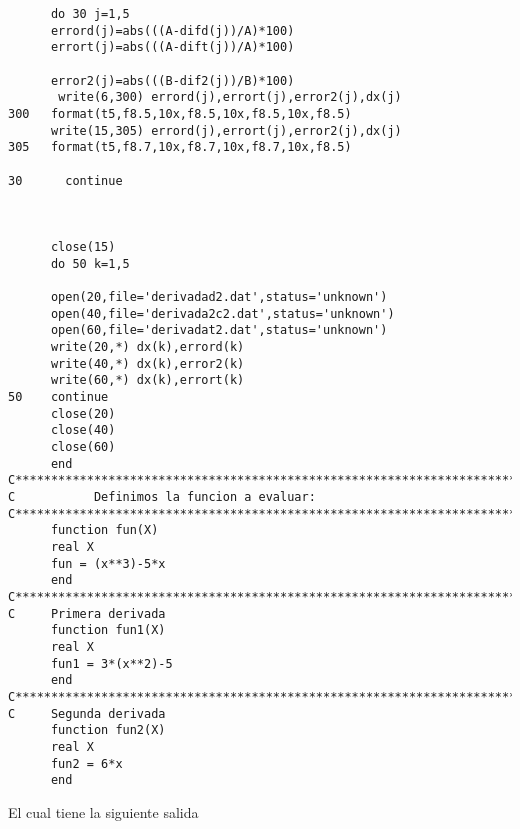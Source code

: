 \documentclass{article}
\begin{document}
\begin{verbatim}
      do 30 j=1,5
      errord(j)=abs(((A-difd(j))/A)*100)
      errort(j)=abs(((A-dift(j))/A)*100)
 
      error2(j)=abs(((B-dif2(j))/B)*100)
       write(6,300) errord(j),errort(j),error2(j),dx(j)
300   format(t5,f8.5,10x,f8.5,10x,f8.5,10x,f8.5)
      write(15,305) errord(j),errort(j),error2(j),dx(j)
305   format(t5,f8.7,10x,f8.7,10x,f8.7,10x,f8.5)
 
30      continue
 
 
 
      close(15)
      do 50 k=1,5
 
      open(20,file='derivadad2.dat',status='unknown')
      open(40,file='derivada2c2.dat',status='unknown')
      open(60,file='derivadat2.dat',status='unknown')
      write(20,*) dx(k),errord(k)
      write(40,*) dx(k),error2(k)
      write(60,*) dx(k),errort(k)
50    continue
      close(20)
      close(40)
      close(60)
      end
C***********************************************************************
C           Definimos la funcion a evaluar:
C***********************************************************************
      function fun(X)
      real X
      fun = (x**3)-5*x
      end
C***********************************************************************
C     Primera derivada
      function fun1(X)
      real X
      fun1 = 3*(x**2)-5
      end
C***********************************************************************
C     Segunda derivada
      function fun2(X)
      real X
      fun2 = 6*x
      end
\end{verbatim}

\bigskip

El cual tiene la siguiente salida
\end{document}
